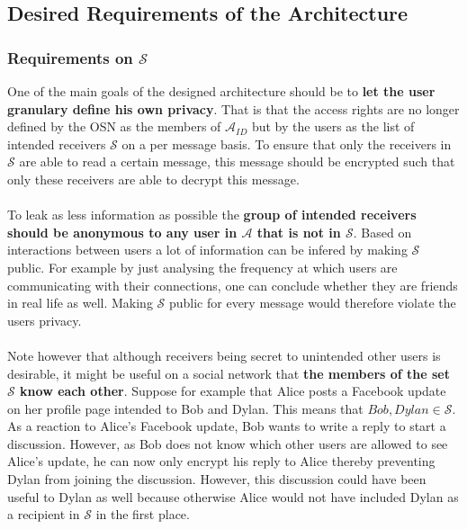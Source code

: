 \documentclass[12pt,openany]{article}
\begin{document}
\subsection{Desired Requirements of the Architecture}
\subsubsection{Requirements on $\mathcal{S}$}
One of the main goals of the designed architecture should be to \textbf{let the
user granulary define his own privacy}. That is that the access rights are no
longer defined by the OSN as the members of $\mathcal{A}_{ID}$ but by the users
as the list of intended receivers $\mathcal{S}$ on a per message basis. To
ensure that only the receivers in $\mathcal{S}$ are able to read a certain
message, this message should be encrypted such that only these receivers are
able to decrypt this message.\\
\\
To leak as less information as possible the \textbf{group of intended receivers
should be anonymous to any user in $\mathcal{A}$ that is not in $\mathcal{S}$}.
Based on interactions between users a lot of information can be infered by
making $\mathcal{S}$ public. For example by just analysing the frequency at
which users are communicating with their connections, one can conclude whether
they are friends in real life as well. Making $\mathcal{S}$ public for every
message would therefore violate the users privacy.\\
\\
Note however that although receivers being secret to unintended other users is
desirable, it might be useful on a social network that \textbf{the members of
the set $\mathcal{S}$ know each other}. Suppose for example that Alice posts a
Facebook update on her profile page intended to Bob and Dylan. This means that
$Bob, Dylan \in \mathcal{S}$. As a reaction to Alice's Facebook update, Bob
wants to write a reply to start a discussion. However, as Bob does not know
which other users are allowed to see Alice's update, he can now only encrypt his
reply to Alice thereby preventing Dylan from joining the discussion. However,
this discussion could have been useful to Dylan as well because otherwise Alice
would not have included Dylan as a recipient in $\mathcal{S}$ in the first
place. 
\end{document}
